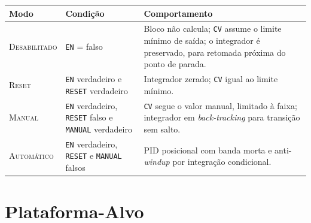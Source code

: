 \begin{quadrofixo}
    \centering
    \begin{tabular}{|l|p{4.6cm}|p{7.2cm}|}
        \hline
        Modo & Condição & Comportamento \\
        \hline
        \textsc{Desabilitado} & \texttt{EN} = falso & Bloco não calcula; \texttt{CV} assume o limite mínimo de saída; o integrador é preservado, para retomada próxima do ponto de parada. \\
        \hline
        \textsc{Reset} & \texttt{EN} verdadeiro e \texttt{RESET} verdadeiro & Integrador zerado; \texttt{CV} igual ao limite mínimo. \\
        \hline
        \textsc{Manual} & \texttt{EN} verdadeiro, \texttt{RESET} falso e \texttt{MANUAL} verdadeiro & \texttt{CV} segue o valor manual, limitado à faixa; integrador em \textit{back-tracking} para transição sem salto. \\
        \hline
        \textsc{Automático} & \texttt{EN} verdadeiro, \texttt{RESET} e \texttt{MANUAL} falsos & PID posicional com banda morta e anti-\textit{windup} por integração condicional. \\
        \hline
    \end{tabular}

    \label{qua:estados-pid}
\end{quadrofixo}


\section{Plataforma-Alvo}
\label{sec:plataforma-alvo}

